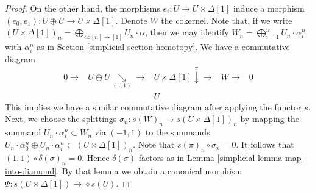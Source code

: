 \begin{proof}
\medskip\noindent
On the other hand, the morphisms $e_i : U \to U \times \Delta[1]$ induce
a morphism $(e_0, e_1) : U \oplus U \to U \times \Delta[1]$.
Denote $W$ the cokernel. Note that, if we write
$(U \times \Delta[1])_n = \bigoplus_{\alpha : [n] \to [1]} U_n \cdot \alpha$,
then we may identify
$W_n = \bigoplus_{i = 1}^n U_n \cdot \alpha^n_i$ with
$\alpha^n_i$ as in Section \ref{simplicial-section-homotopy}.
We have a commutative diagram
$$
\begin{array}{ccccc}0 \longrightarrow & U \oplus U \underset{(1, 1)}{\searrow}\longrightarrow & U \times \Delta[1] \overset{\pi}{\downarrow}\longrightarrow & W \longrightarrow & 0 \\  &  & U &  & \end{array}
$$
This implies we have a similar commutative diagram after
applying the functor $s$. Next, we choose the splittings
$\sigma_n : s(W)_n \to s(U \times \Delta[1])_n$ by mapping
the summand $U_n \cdot \alpha^n_i \subset W_n$ via $(-1, 1)$
to the summands $U_n \cdot \alpha^n_0 \oplus U_n \cdot \alpha^n_i
\subset (U \times \Delta[1])_n$. Note that $s(\pi)_n \circ \sigma_n = 0$.
It follows that $(1, 1) \circ \delta(\sigma)_n = 0$.
Hence $\delta(\sigma)$ factors as in
Lemma \ref{simplicial-lemma-map-into-diamond}. By that lemma
we obtain a canonical morphism
$\Psi : s(U \times \Delta[1]) \to \diamond{s(U)}$.


\end{proof}
